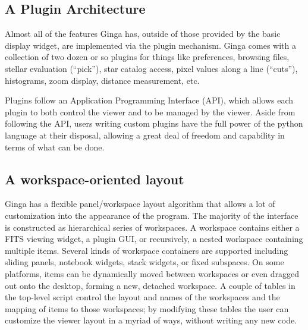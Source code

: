 \subsection{A Plugin Architecture}
Almost all of the features Ginga has, outside of those provided by the basic display widget, are implemented via the plugin mechanism. Ginga comes with a collection of two dozen or so plugins for things like preferences, browsing files, stellar evaluation (``pick''), star catalog access, pixel values along a line (``cuts''), histograms, zoom display, distance measurement, etc.

Plugins follow an Application Programming Interface (API), which allows each plugin to both control the viewer and to be managed by the viewer. Aside from following the API, users writing custom plugins have the full power of the python language at their disposal, allowing a great deal of freedom and capability in terms of what can be done.   

\subsection{A workspace-oriented layout}
Ginga has a flexible panel/workspace layout algorithm that allows a lot of customization into the appearance of the program.  The majority of the interface is constructed as hierarchical series of workspaces. A workspace contains either a FITS viewing widget, a plugin GUI, or recursively, a nested workspace containing multiple items. Several kinds of workspace containers are supported including sliding panels, notebook widgets, stack widgets, or fixed subspaces. On some platforms, items can be dynamically moved between workspaces or even dragged out onto the desktop, forming a new, detached workspace. A couple of tables in the top-level script control the layout and names of the workspaces and the mapping of items to those workspaces; by modifying these tables the user can customize the viewer layout in a myriad of ways, without writing any new code. 

